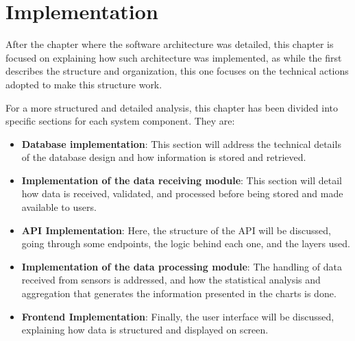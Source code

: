 \chapter{Implementation}\label{cap:implementation}

After the chapter where the software architecture was detailed, this chapter is focused on explaining how such architecture was implemented, as while the first describes the structure and organization, this one focuses on the technical actions adopted to make this structure work.

For a more structured and detailed analysis, this chapter has been divided into specific sections for each system component. They are:

\begin{itemize}
    \item \textbf{Database implementation}: This section will address the technical details of the database design and how information is stored and retrieved.
    
    \item \textbf{Implementation of the data receiving module}: This section will detail how data is received, validated, and processed before being stored and made available to users.
    
    \item \textbf{API Implementation}: Here, the structure of the \gls{API} will be discussed, going through some endpoints, the logic behind each one, and the layers used.
    
    \item \textbf{Implementation of the data processing module}: The handling of data received from sensors is addressed, and how the statistical analysis and aggregation that generates the information presented in the charts is done.
    
    \item \textbf{Frontend Implementation}: Finally, the user interface will be discussed, explaining how data is structured and displayed on screen.
\end{itemize}






